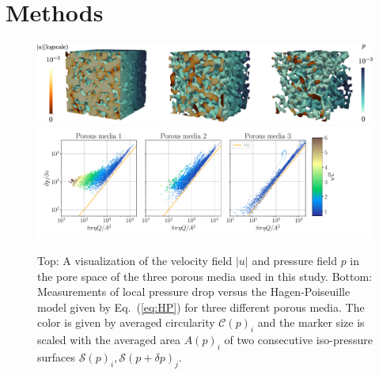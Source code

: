 \documentclass[draft]{agujournal2019}
\begin{document}
\section{Methods}
\begin{figure}[t!]
\includegraphics[width=1.0\linewidth]{figures/DNS_overview.eps}
\includegraphics[width=1.2\linewidth]{figures/infi_dpdx_3.pdf}
\caption{Top: A visualization of the velocity field $|u|$ and pressure field $p$ in the pore space of the three porous media used in this study. Bottom: Measurements of local pressure drop versus the Hagen-Poiseuille model given by Eq.~(\ref{eq:HP}) for three different porous media. The color is given by averaged circularity $\mathcal{C}(p)_i$ and the marker size is scaled with the averaged area $A(p)_i$ of two consecutive iso-pressure surfaces $\mathcal{S}(p)_i,\mathcal{S}(p+\delta p)_j$. }
\label{fig:DNS}
\end{figure}
\end{document}
